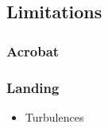 \subsection{Limitations}

\begin{frame}
\frametitle{Acrobat}

  
\end{frame}


\begin{frame}
\frametitle{Landing}

  \begin{itemize}
    \item Turbulences    
  \end{itemize}
  
\end{frame}